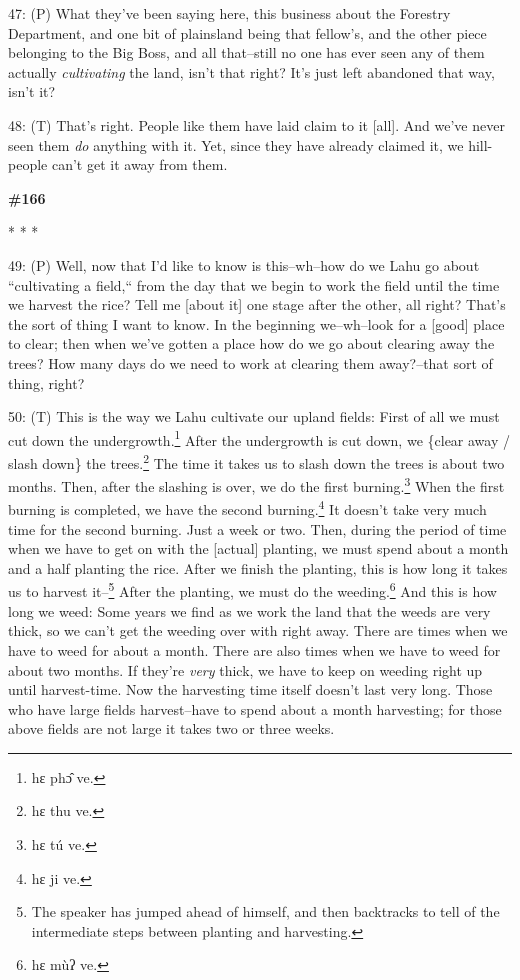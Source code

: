 47: (P) What they've been saying here, this business about the Forestry Department,
and one bit of plainsland being that fellow's, and the other piece belonging to
the Big Boss, and all that--still no one has ever seen any of them actually \textit{cultivating}
the land, isn't that right? It's just left abandoned that way, isn't it?

48: (T) That's right. People like them have laid claim to it [all]. And we've never
seen them \textit{do }anything with it. Yet, since they have already claimed it,
we hill-people can't get it away from them.

\begin{center}
\textbf{\#166 }

* * *
\end{center}

\leftskip=0pt
49: (P) Well, now that I'd like to know is this--wh--how do we Lahu go about ``cultivating
a field,`` from the day that we begin to work the field until the time
we harvest the rice? Tell me [about it] one stage after the other, all right? That's
the sort of thing I want to know. In the beginning we--wh--look for a [good] place
to clear; then when we've gotten a place how do we go about clearing away the trees?
How many days do we need to work at clearing them away?--that sort of thing, right?

50: (T) This is the way we Lahu cultivate our upland fields: First of all we must
cut down the undergrowth.\footnote{hɛ phɔ̂ ve.} After the undergrowth is cut down, we \{clear away
/ slash down\} the trees.\footnote{hɛ thu ve.} The time it takes us to slash down the trees is about
two months. Then, after the slashing is over, we do the first burning.\footnote{hɛ tú ve.} When
the first burning is completed, we have the second burning.\footnote{hɛ ji ve.} It doesn't take
very much time for the second burning. Just a week or two. Then, during the period
of time when we have to get on with the [actual] planting, we must spend about
a month and a half planting the rice. After we finish the planting, this is how
long it takes us to harvest it--\footnote{The speaker has jumped ahead of himself, and then backtracks to tell of the intermediate steps between planting and harvesting.} After the planting, we must do the weeding.\footnote{hɛ mùʔ ve.}
And this is how long we weed: Some years we find as we work the land that the weeds
are very thick, so we can't get the weeding over with right away. There are times
when we have to weed for about a month. There are also times when we have to weed
for about two months. If they're \textit{very} thick, we have to keep on weeding
right up until harvest-time. Now the harvesting time itself doesn't last very long.
Those who have large fields harvest--have to spend about a month harvesting; for
those above fields are not large it takes two or three weeks.

